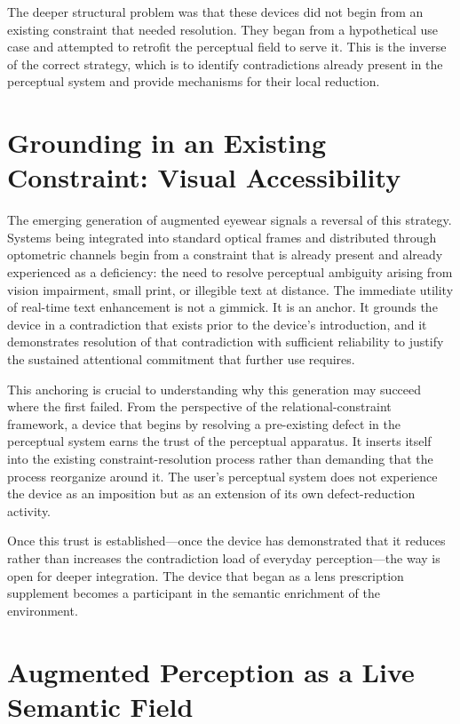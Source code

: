 \documentclass[12pt,a4paper,openany]{book}
\theoremstyle{plain}
\theoremstyle{definition}
\theoremstyle{remark}
\begin{document}
The deeper structural problem was that these devices did not begin from an existing constraint that needed resolution. They began from a hypothetical use case and attempted to retrofit the perceptual field to serve it. This is the inverse of the correct strategy, which is to identify contradictions already present in the perceptual system and provide mechanisms for their local reduction.

\section{Grounding in an Existing Constraint: Visual Accessibility}

The emerging generation of augmented eyewear signals a reversal of this strategy. Systems being integrated into standard optical frames and distributed through optometric channels begin from a constraint that is already present and already experienced as a deficiency: the need to resolve perceptual ambiguity arising from vision impairment, small print, or illegible text at distance. The immediate utility of real-time text enhancement is not a gimmick. It is an anchor. It grounds the device in a contradiction that exists prior to the device's introduction, and it demonstrates resolution of that contradiction with sufficient reliability to justify the sustained attentional commitment that further use requires.

This anchoring is crucial to understanding why this generation may succeed where the first failed. From the perspective of the relational-constraint framework, a device that begins by resolving a pre-existing defect in the perceptual system earns the trust of the perceptual apparatus. It inserts itself into the existing constraint-resolution process rather than demanding that the process reorganize around it. The user's perceptual system does not experience the device as an imposition but as an extension of its own defect-reduction activity.

Once this trust is established---once the device has demonstrated that it reduces rather than increases the contradiction load of everyday perception---the way is open for deeper integration. The device that began as a lens prescription supplement becomes a participant in the semantic enrichment of the environment.

\section{Augmented Perception as a Live Semantic Field}
\end{document}
